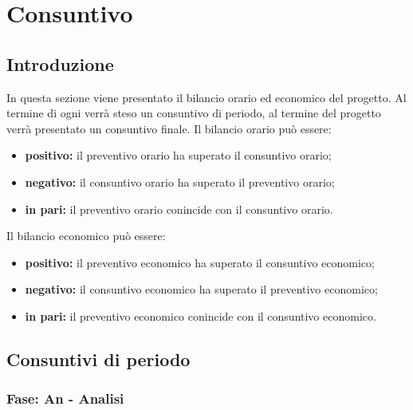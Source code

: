 
\section {Consuntivo}
	\subsection {Introduzione}
	In questa sezione viene presentato il bilancio orario ed economico del progetto. Al termine di ogni  verrà steso un consuntivo di periodo, al termine del progetto verrà presentato un consuntivo finale.
	Il bilancio orario può essere:
	\begin{itemize}
	\item \textbf{positivo:} il preventivo orario ha superato il consuntivo orario;
	\item \textbf{negativo:} il consuntivo orario ha superato il preventivo orario;
	\item \textbf{in pari:} il preventivo orario conincide con il consuntivo orario.
	\end{itemize}
	Il bilancio economico può essere:
	\begin{itemize}
	\item \textbf{positivo:} il preventivo economico ha superato il consuntivo economico;
	\item \textbf{negativo:} il consuntivo economico ha superato il preventivo economico;
	\item \textbf{in pari:}  il preventivo economico conincide con il consuntivo economico.
	\end{itemize}
	\subsection {Consuntivi di periodo}
		\subsubsection {Fase: An - Analisi}
